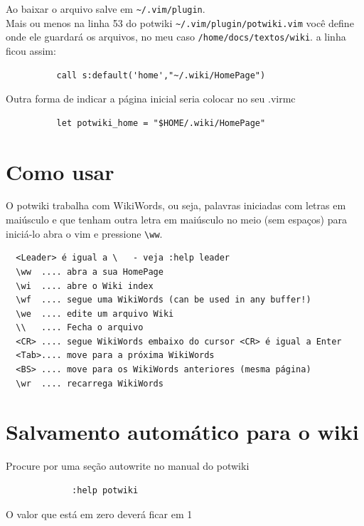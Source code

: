\documentclass[10pt,a4paper,openany]{book}
\begin{document}
Ao baixar o arquivo salve em \verb|~/.vim/plugin|. \\



Mais ou menos na linha 53 do potwiki \verb|~/.vim/plugin/potwiki.vim| você
define onde ele guardará os arquivos, no meu caso
\verb|/home/docs/textos/wiki|. a linha ficou assim:

\begin{verbatim}
		  call s:default('home',"~/.wiki/HomePage")
\end{verbatim}

Outra forma de indicar a página inicial seria colocar no seu .virmc

\begin{verbatim}
		  let potwiki_home = "$HOME/.wiki/HomePage"
\end{verbatim}

\section{Como usar}
\label{Como usar}

O potwiki trabalha com WikiWords, ou seja, palavras iniciadas com
letras em maiúsculo e que tenham outra letra em maiúsculo no meio (sem
espaços) para iniciá-lo abra o vim e pressione \verb|\ww|.

\begin{verbatim}
  <Leader> é igual a \   - veja :help leader
  \ww  .... abra a sua HomePage
  \wi  .... abre o Wiki index
  \wf  .... segue uma WikiWords (can be used in any buffer!)
  \we  .... edite um arquivo Wiki
  \\   .... Fecha o arquivo
  <CR> .... segue WikiWords embaixo do cursor <CR> é igual a Enter
  <Tab>.... move para a próxima WikiWords
  <BS> .... move para os WikiWords anteriores (mesma página)
  \wr  .... recarrega WikiWords
\end{verbatim}

\section{Salvamento automático para o wiki }
\label{Salvamento automático para o wiki }
Procure por uma seção autowrite no manual do potwiki

\begin{verbatim}
			 :help potwiki
\end{verbatim}

O valor que está em zero deverá ficar em 1
\end{document}
